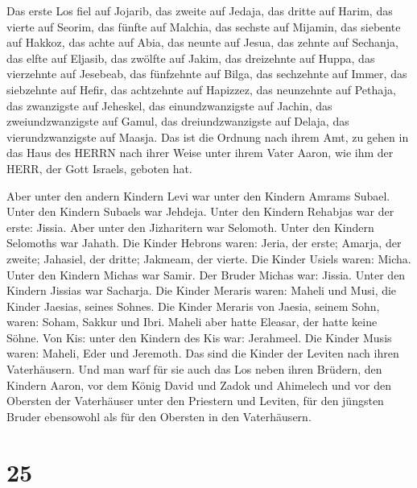  Das erste Los fiel auf Jojarib, das zweite auf Jedaja,
 das dritte auf Harim, das vierte auf Seorim, 
das fünfte auf Malchia, das sechste auf Mijamin,  das
siebente auf Hakkoz, das achte auf Abia,  das neunte auf
Jesua, das zehnte auf Sechanja,  das elfte auf Eljasib, das
zwölfte auf Jakim,  das dreizehnte auf Huppa, das
vierzehnte auf Jesebeab,  das fünfzehnte auf Bilga, das
sechzehnte auf Immer,  das siebzehnte auf Hefir, das
achtzehnte auf Hapizzez,  das neunzehnte auf Pethaja, das
zwanzigste auf Jeheskel,  das einundzwanzigste auf Jachin,
das zweiundzwanzigste auf Gamul,  das dreiundzwanzigste auf
Delaja, das vierundzwanzigste auf Maasja.  Das ist die
Ordnung nach ihrem Amt, zu gehen in das Haus des HERRN nach ihrer Weise
unter ihrem Vater Aaron, wie ihm der HERR, der Gott Israels, geboten
hat.

 Aber unter den andern Kindern Levi war unter den Kindern
Amrams Subael. Unter den Kindern Subaels war Jehdeja. 
Unter den Kindern Rehabjas war der erste: Jissia.  Aber
unter den Jizharitern war Selomoth. Unter den Kindern Selomoths war
Jahath.  Die Kinder Hebrons waren: Jeria, der erste;
Amarja, der zweite; Jahasiel, der dritte; Jakmeam, der vierte.
 Die Kinder Usiels waren: Micha. Unter den Kindern Michas
war Samir.  Der Bruder Michas war: Jissia. Unter den
Kindern Jissias war Sacharja.  Die Kinder Meraris waren:
Maheli und Musi, die Kinder Jaesias, seines Sohnes.  Die
Kinder Meraris von Jaesia, seinem Sohn, waren: Soham, Sakkur und Ibri.
 Maheli aber hatte Eleasar, der hatte keine Söhne.
 Von Kis: unter den Kindern des Kis war: Jerahmeel.
 Die Kinder Musis waren: Maheli, Eder und Jeremoth. Das
sind die Kinder der Leviten nach ihren Vaterhäusern.  Und
man warf für sie auch das Los neben ihren Brüdern, den Kindern Aaron,
vor dem König David und Zadok und Ahimelech und vor den Obersten der
Vaterhäuser unter den Priestern und Leviten, für den jüngsten Bruder
ebensowohl als für den Obersten in den Vaterhäusern.

\hypertarget{section-24}{%
\section{25}\label{section-24}}

